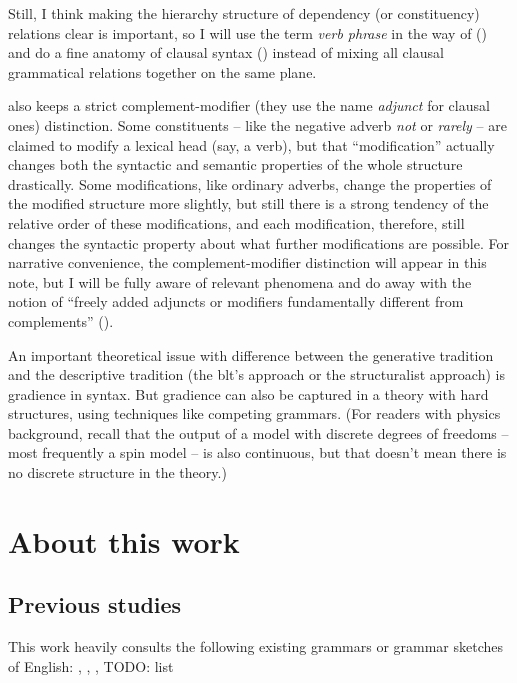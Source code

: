 \documentclass[UTF8, a4paper, oneside, scheme=plain]{ctexrep}
\newcommand*{\term}[1]{\emph{#1}}
\newcommand{\corpus}[1]{\emph{#1}}
\begin{document}
Still, I think making the hierarchy structure of dependency (or constituency) relations clear 
is important,
so I will use the term \term{verb phrase} in the way of \citet{cgel} ()
and do a fine anatomy of clausal syntax ()
instead of mixing all clausal grammatical relations together on the same plane.

\cite{cgel} also keeps a strict complement-modifier 
(they use the name \term{adjunct} for clausal ones) distinction.
Some constituents -- like the negative adverb \corpus{not} or \corpus{rarely} -- 
are claimed to modify a lexical head (say, a verb),
but that ``modification'' actually changes 
both the syntactic and semantic properties of the whole structure drastically.
Some modifications, like ordinary adverbs,
change the properties of the modified structure more slightly,
but still there is a strong tendency of the relative order of these modifications,
and each modification, therefore, still changes the syntactic property 
about what further modifications are possible.
For narrative convenience, the complement-modifier distinction will appear in this note,
but I will be fully aware of relevant phenomena
and do away with the notion of 
``freely added adjuncts or modifiers fundamentally different from complements'' ().

An important theoretical issue with difference between the generative tradition 
and the descriptive tradition (the \acs{blt}'s approach or the structuralist approach)
is gradience in syntax.
But gradience can also be captured in a theory with hard structures,
using techniques like competing grammars.
(For readers with physics background,
recall that the output of a model with discrete degrees of freedoms 
-- most frequently a spin model -- is also continuous,
but that doesn't mean there is no discrete structure in the theory.)

\section{About this work}

\subsection{Previous studies}

This work heavily consults the following existing grammars or grammar sketches of English:
\citet{cgel}, \citet{dixon2005semantic}, \citet{quirk1985}, TODO: list 
\end{document}
